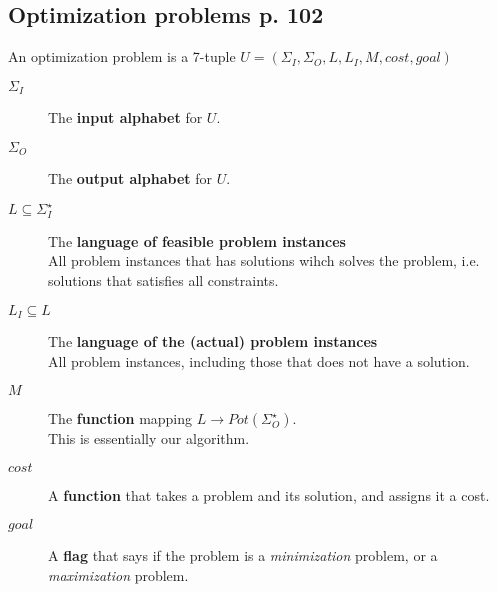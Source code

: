 \documentclass[a4paper,10pt]{article}
\begin{document}
\subsection{Optimization problems p. 102}
An optimization problem is a 7-tuple $U = (\Sigma _I, \Sigma _O, L, L_I, M, cost, goal)$
\begin{description}
\item[$\Sigma _I$] 											The \textbf{input alphabet} for $U$.
\item[$\Sigma _ O$] 										The \textbf{output alphabet} for $U$.
\item[$L \subseteq \Sigma_{I}^{\star}$]	The \textbf{language of feasible problem instances} \hfill \\
    All problem instances that has solutions wihch solves the problem, i.e.
    solutions that satisfies all constraints.
\item[$L_I \subseteq L$]								The \textbf{language of the (actual) problem instances} \hfill \\
    All problem instances, including those that does not have a solution.
\item[$M$] 															The \textbf{function} mapping $L \rightarrow Pot(\Sigma_{O}^\star)$. \hfill \\
																				This is essentially our algorithm.
\item[$cost$]														A \textbf{function} that takes a problem and its solution, and assigns it a cost.
\item[$goal$]														A \textbf{flag} that says if the problem is a \emph{minimization} problem, or a \emph{maximization} problem.
\end{description}
\end{document}
